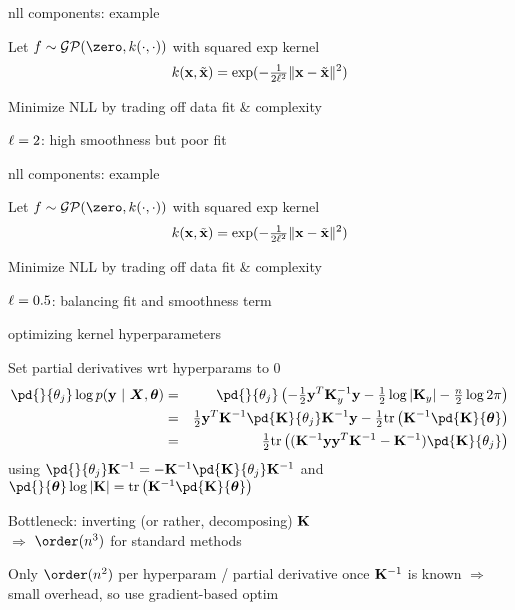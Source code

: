\documentclass[11pt,compress,t,notes=noshow, xcolor=table]{beamer}
\begin{document}
\begin{framei}[sep=L]{nll components: example}
\item Let $f \sim \gpzk$ with squared exp kernel $$k(\mathbf{x}, \tilde{\mathbf{x}}) = \exp(-\tfrac{1}{2 \ell^2} \| \mathbf{x} - \tilde{\mathbf{x}} \|^2)$$
\item Minimize NLL by trading off data fit \& complexity
\item $\ell = 2$: high smoothness but poor fit
\vfill
{}
\end{framei}

\begin{framei}[sep=L]{nll components: example}
\item Let $f \sim \gpzk$ with squared exp kernel $$k(\mathbf{x}, \tilde{\mathbf{x}}) = \exp(-\tfrac{1}{2 \ell^2} \| \mathbf{x} - \tilde{\mathbf{x}} \|^2)$$
\item Minimize NLL by trading off data fit \& complexity
\item $\ell = 0.5$: balancing fit and smoothness term
\vfill
{}
\end{framei}


\begin{framei}[sep=L]{optimizing kernel hyperparameters}
\item Set partial derivatives wrt hyperparams to 0
\begin{eqnarray*}
\pd{}{\theta_j}
\log p(\yv ~|~ \bm{X}, \thetav) &=& \pd{}{\theta_j}  \left(-\tfrac{1}{2}\yv^T\Ky^{-1} \yv - \tfrac{1}{2} \log \left| \Ky \right| - \tfrac{n}{2} \log 2\pi\right) \\ 
&=&\tfrac{1}{2} \yv^T \Kmatinv \pd{\Kmat}{\theta_j}\Kmatinv \yv - \tfrac{1}{2} \text{tr}\left(\Kmatinv \pd{\Kmat}{ \thetav} \right) \\
&=& \tfrac{1}{2} \text{tr}\left((\Kmatinv\yv\yv^T\Kmatinv - \Kmatinv)\pd{\Kmat}{\theta_j}\right)
\end{eqnarray*}
using $\pd{}{\theta_j} \Kmatinv = - \Kmatinv  \pd{\Kmat}{\theta_j}\Kmatinv$ and $\pd{}{\thetav} \log  |\Kmat| = \text{tr}\left(\Kmatinv \pd{\Kmat}{\thetav} \right)$
\item Bottleneck: inverting (or rather, decomposing) $\mathbf{K}$ \\$\Rightarrow$ $\order(n^3)$ for standard methods
\item Only $\order(n^2)$ per hyperparam / partial derivative once $\mathbf{K}^{-1}$ is known $\Rightarrow$ small overhead, so use gradient-based optim 
\end{framei}
\end{document}
